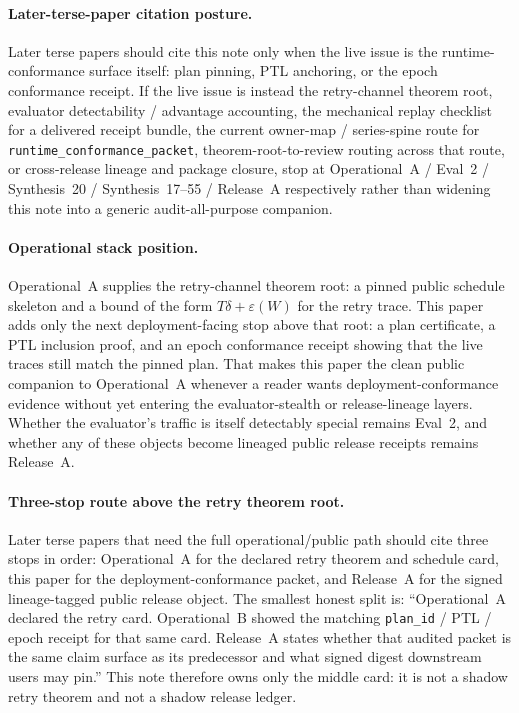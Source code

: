 \documentclass[11pt]{article}
\begin{document}
\paragraph{Later-terse-paper citation posture.}
Later terse papers should cite this note only when the live issue is the runtime-conformance surface itself: plan pinning, PTL anchoring, or the epoch conformance receipt. If the live issue is instead the retry-channel theorem root, evaluator detectability / advantage accounting, the mechanical replay checklist for a delivered receipt bundle, the current owner-map / series-spine route for \nolinkurl{runtime_conformance_packet}, theorem-root-to-review routing across that route, or cross-release lineage and package closure, stop at Operational~A / Eval~2 / Synthesis~20 / Synthesis~17--55 / Release~A respectively rather than widening this note into a generic audit-all-purpose companion.\cite{series:operationalA,series:advantagecontracts,series:auditorreplay,series:workedexample,series:seriesspines,series:releaseproperty}

\paragraph{Operational stack position.}
Operational~A supplies the retry-channel theorem root: a pinned public schedule skeleton and a bound of the form $T\delta+\varepsilon(W)$ for the retry trace.
This paper adds only the next deployment-facing stop above that root: a plan certificate, a PTL inclusion proof, and an epoch conformance receipt showing that the live traces still match the pinned plan.
That makes this paper the clean public companion to Operational~A whenever a reader wants deployment-conformance evidence without yet entering the evaluator-stealth or release-lineage layers.
Whether the evaluator's traffic is itself detectably special remains Eval~2, and whether any of these objects become lineaged public release receipts remains Release~A.\cite{series:operationalA,series:advantagecontracts,series:releaseproperty}

\paragraph{Three-stop route above the retry theorem root.}
Later terse papers that need the full operational/public path should cite three stops in order: Operational~A for the declared retry theorem and schedule card, this paper for the deployment-conformance packet, and Release~A for the signed lineage-tagged public release object.
The smallest honest split is: ``Operational~A declared the retry card. Operational~B showed the matching \texttt{plan\_id} / PTL / epoch receipt for that same card. Release~A states whether that audited packet is the same claim surface as its predecessor and what signed digest downstream users may pin.''
This note therefore owns only the middle card: it is not a shadow retry theorem and not a shadow release ledger.\cite{series:operationalA,series:releaseproperty}
\end{document}
